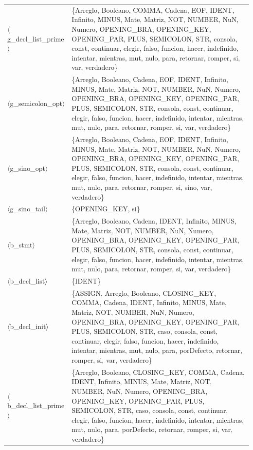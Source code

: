 \documentclass[10pt]{article}
\begin{document}
{\begin{longtable}{@{} p{3.5cm} p{13cm} @{}}
  \parbox[t]{3.3cm}{\raggedright$\langle$g\_\allowbreak{}decl\_\allowbreak{}list\_\allowbreak{}prime$\rangle$} & \{Arreglo, Booleano, COMMA, Cadena, EOF, IDENT, Infinito, MINUS, Mate, Matriz, NOT, NUMBER, NuN, Numero, OPENING\_BRA, OPENING\_KEY, OPENING\_PAR, PLUS, SEMICOLON, STR, consola, const, continuar, elegir, falso, funcion, hacer, indefinido, intentar, mientras, mut, nulo, para, retornar, romper, si, var, verdadero\} \\
  \parbox[t]{3.3cm}{\raggedright$\langle$g\_\allowbreak{}semicolon\_\allowbreak{}opt$\rangle$} & \{Arreglo, Booleano, Cadena, EOF, IDENT, Infinito, MINUS, Mate, Matriz, NOT, NUMBER, NuN, Numero, OPENING\_BRA, OPENING\_KEY, OPENING\_PAR, PLUS, SEMICOLON, STR, consola, const, continuar, elegir, falso, funcion, hacer, indefinido, intentar, mientras, mut, nulo, para, retornar, romper, si, var, verdadero\} \\
  \parbox[t]{3.3cm}{\raggedright$\langle$g\_\allowbreak{}sino\_\allowbreak{}opt$\rangle$} & \{Arreglo, Booleano, Cadena, EOF, IDENT, Infinito, MINUS, Mate, Matriz, NOT, NUMBER, NuN, Numero, OPENING\_BRA, OPENING\_KEY, OPENING\_PAR, PLUS, SEMICOLON, STR, consola, const, continuar, elegir, falso, funcion, hacer, indefinido, intentar, mientras, mut, nulo, para, retornar, romper, si, sino, var, verdadero\} \\
  \parbox[t]{3.3cm}{\raggedright$\langle$g\_\allowbreak{}sino\_\allowbreak{}tail$\rangle$} & \{OPENING\_KEY, si\} \\
  \parbox[t]{3.3cm}{\raggedright$\langle$b\_\allowbreak{}stmt$\rangle$} & \{Arreglo, Booleano, Cadena, IDENT, Infinito, MINUS, Mate, Matriz, NOT, NUMBER, NuN, Numero, OPENING\_BRA, OPENING\_KEY, OPENING\_PAR, PLUS, SEMICOLON, STR, consola, const, continuar, elegir, falso, funcion, hacer, indefinido, intentar, mientras, mut, nulo, para, retornar, romper, si, var, verdadero\} \\
  \parbox[t]{3.3cm}{\raggedright$\langle$b\_\allowbreak{}decl\_\allowbreak{}list$\rangle$} & \{IDENT\} \\
  \parbox[t]{3.3cm}{\raggedright$\langle$b\_\allowbreak{}decl\_\allowbreak{}init$\rangle$} & \{ASSIGN, Arreglo, Booleano, CLOSING\_KEY, COMMA, Cadena, IDENT, Infinito, MINUS, Mate, Matriz, NOT, NUMBER, NuN, Numero, OPENING\_BRA, OPENING\_KEY, OPENING\_PAR, PLUS, SEMICOLON, STR, caso, consola, const, continuar, elegir, falso, funcion, hacer, indefinido, intentar, mientras, mut, nulo, para, porDefecto, retornar, romper, si, var, verdadero\} \\
  \parbox[t]{3.3cm}{\raggedright$\langle$b\_\allowbreak{}decl\_\allowbreak{}list\_\allowbreak{}prime$\rangle$} & \{Arreglo, Booleano, CLOSING\_KEY, COMMA, Cadena, IDENT, Infinito, MINUS, Mate, Matriz, NOT, NUMBER, NuN, Numero, OPENING\_BRA, OPENING\_KEY, OPENING\_PAR, PLUS, SEMICOLON, STR, caso, consola, const, continuar, elegir, falso, funcion, hacer, indefinido, intentar, mientras, mut, nulo, para, porDefecto, retornar, romper, si, var, verdadero\} \\

\end{longtable}}
\end{document}
